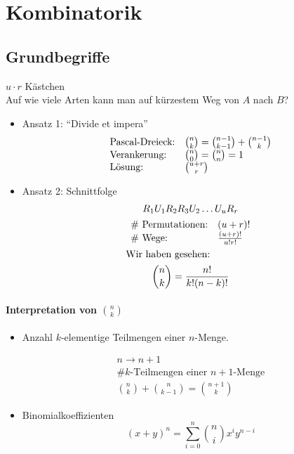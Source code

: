 \chapter{Kombinatorik}
\section{Grundbegriffe}
\begin{bsp*}
	$u \cdot r$ Kästchen\\
	Auf wie viele Arten kann man auf kürzestem Weg von $A$ nach $B$?\\
	\begin{itemize}
		\item Ansatz 1: \enquote{Divide et impera}
		\begin{gather*}
			\begin{array}{ l l }
				\text{Pascal-Dreieck:}		& \binom{n}{k} = \binom{n-1}{k-1} + \binom{n-1}{k}	\\
				\text{Verankerung:}		& \binom{n}{0} = \binom{n}{n} = 1					\\
				\text{Lösung:}			& \binom{u+r}{r}								
			\end{array}
		\end{gather*}
		\item Ansatz 2: Schnittfolge
		\begin{gather*}
			R_1 U_1 R_2 R_3 U_2 \dots U_u R_r \\
			\begin{array}{ l l }
				\text{\# Permutationen:}	& (u+r)!			\\
				\text{\# Wege:}			& \frac{(u+r)!}{u!r!}	
			\end{array}\\
			\intertext{Wir haben gesehen:}
			\binom{n}{k} = \frac{n!}{k!(n-k)!}
		\end{gather*}
	\end{itemize}
\end{bsp*}

\subsubsection{Interpretation von \texorpdfstring{$\binom{n}{k}$}{n tief k}}
\begin{itemize}
	\item Anzahl $k$-elementige Teilmengen einer $n$-Menge. \\
		\begin{bew}[note = {Direkter Beweis: Induktion über $n$}]
			\begin{gather*}
				n \rightarrow n+1 \\
				\# k\text{-Teilmengen einer } n+1\text{-Menge} \\
				\binom{n}{k} + \binom{n}{k-1} = \binom{n+1}{k}
			\end{gather*}
		\end{bew}
	\item Binomialkoeffizienten\\
		\[ (x+y)^n = \sum_{i=0}^n \binom{n}{i} x^i y^{n-i} \]
\end{itemize}

